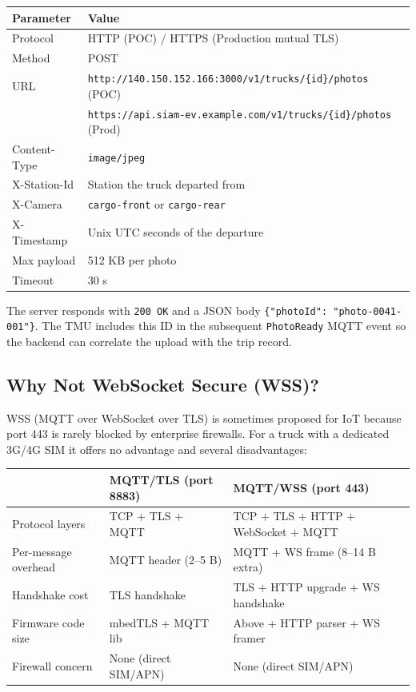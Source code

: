 \documentclass{article}
\begin{document}
\begin{center}
\begin{tabular}{ll}
\toprule
\textbf{Parameter} & \textbf{Value}\\
\midrule
Protocol        & HTTP (POC) / HTTPS (Production mutual TLS)\\
Method          & POST\\
URL             & \texttt{http://140.150.152.166:3000/v1/trucks/\{id\}/photos} (POC)\\
                & \texttt{https://api.siam-ev.example.com/v1/trucks/\{id\}/photos} (Prod)\\
Content-Type    & \texttt{image/jpeg}\\
X-Station-Id    & Station the truck departed from\\
X-Camera        & \texttt{cargo-front} or \texttt{cargo-rear}\\
X-Timestamp     & Unix UTC seconds of the departure\\
Max payload     & 512 KB per photo\\
Timeout         & 30 s\\
\bottomrule
\end{tabular}
\end{center}

\noindent The server responds with \texttt{200 OK} and a JSON body
\texttt{\{"photoId": "photo-0041-001"\}}. The TMU includes this ID in the
subsequent \texttt{PhotoReady} MQTT event so the backend can correlate the
upload with the trip record.

\subsection{Why Not WebSocket Secure (WSS)?}
\label{sec:why-not-wss}

WSS (MQTT over WebSocket over TLS) is sometimes proposed for IoT because port 443
is rarely blocked by enterprise firewalls. For a truck with a dedicated 3G/4G SIM
it offers no advantage and several disadvantages:

\begin{center}
\begin{tabular}{lll}
\toprule
 & \textbf{MQTT/TLS (port 8883)} & \textbf{MQTT/WSS (port 443)}\\
\midrule
Protocol layers    & TCP + TLS + MQTT          & TCP + TLS + HTTP + WebSocket + MQTT\\
Per-message overhead & MQTT header (2--5 B)    & MQTT + WS frame (8--14 B extra)\\
Handshake cost     & TLS handshake             & TLS + HTTP upgrade + WS handshake\\
Firmware code size & mbedTLS + MQTT lib        & Above + HTTP parser + WS framer\\
Firewall concern   & None (direct SIM/APN)     & None (direct SIM/APN)\\
\bottomrule
\end{tabular}
\end{center}
\end{document}
